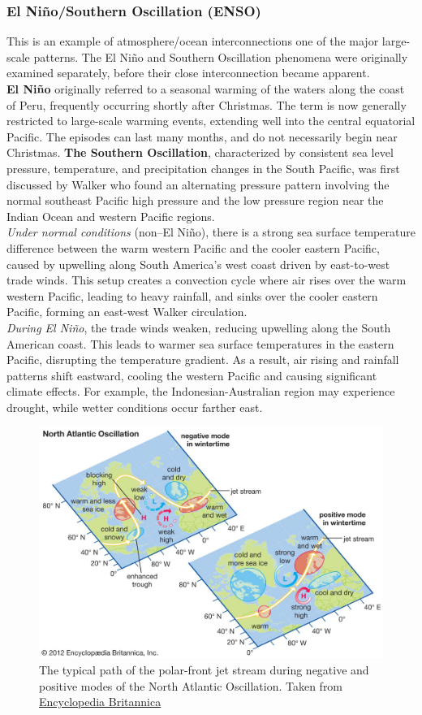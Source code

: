 \subsubsection{El Niño/Southern Oscillation (ENSO)}\label{subsubsec:ENSO}
This is an example of atmosphere/ocean interconnections one of the major large-scale patterns. The El Niño and Southern Oscillation phenomena were originally examined separately, before their close interconnection became apparent.\\
[0.1cm]
\textbf{El Niño} originally referred to a seasonal warming of the waters along the coast of Peru, frequently occurring shortly after Christmas. The term is now generally restricted to large-scale warming events, extending well into the central equatorial Pacific. The episodes can last many months, and do not necessarily begin near Christmas. \textbf{The Southern Oscillation}, characterized by consistent sea level pressure, temperature, and precipitation changes in the South Pacific, was first discussed by Walker who found an alternating pressure pattern involving the normal southeast Pacific high pressure and the low pressure region near the Indian Ocean and western Pacific regions. \\
[0,1cm]
\textit{Under normal conditions} (non–El Niño), there is a strong sea surface temperature difference between the warm western Pacific and the cooler eastern Pacific, caused by upwelling along South America's west coast driven by east-to-west trade winds. This setup creates a convection cycle where air rises over the warm western Pacific, leading to heavy rainfall, and sinks over the cooler eastern Pacific, forming an east-west Walker circulation.\\
\textit{During El Niño}, the trade winds weaken, reducing upwelling along the South American coast. This leads to warmer sea surface temperatures in the eastern Pacific, disrupting the temperature gradient. As a result, air rising and rainfall patterns shift eastward, cooling the western Pacific and causing significant climate effects. For example, the Indonesian-Australian region may experience drought, while wetter conditions occur farther east.
\begin{figure}[htpb]
	\centering
	\includegraphics[width=0.7\linewidth]{figs/path-jet-stream-modes-North-Atlantic-Oscillation}
	\caption{The typical path of the polar-front jet stream during negative and positive modes of the North Atlantic Oscillation.
		Taken from \href{https://www.britannica.com/science/North-Atlantic-Oscillation#/media/1/661549/158215}{Encyclopedia Britannica}}
	\label{fig:path-jetstream-NAO}
\end{figure}


